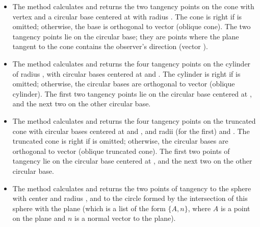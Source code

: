 \begin{itemize}
    \item The method  calculates and returns the two tangency points on the cone with vertex  and a circular base centered at  with radius . The cone is right if  is omitted; otherwise, the base is orthogonal to vector  (oblique cone). The two tangency points lie on the circular base; they are points where the plane tangent to the cone contains the observer's direction (vector ). 

    \item The method  calculates and returns the four tangency points on the cylinder of radius , with circular bases centered at  and . The cylinder is right if  is omitted; otherwise, the circular bases are orthogonal to vector  (oblique cylinder). The first two tangency points lie on the circular base centered at , and the next two on the other circular base. 

    \item The method  calculates and returns the four tangency points on the truncated cone with circular bases centered at  and , and radii  (for the first) and . The truncated cone is right if  is omitted; otherwise, the circular bases are orthogonal to vector  (oblique truncated cone). The first two points of tangency lie on the circular base centered at , and the next two on the other circular base. 

    \item The method  calculates and returns the two points of tangency to the sphere with center  and radius , and to the circle formed by the intersection of this sphere with the plane  (which is a list of the form $\{A,n\}$, where $A$ is a point on the plane and $n$ is a normal vector to the plane).
\end{itemize}

